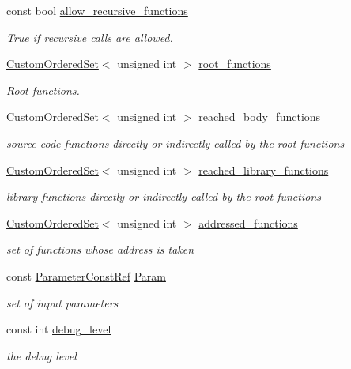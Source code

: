 \begin{DoxyCompactItemize}
const bool \hyperlink{classCallGraphManager_a04e714703a5d955d0ddb00664e89467d}{allow\+\_\+recursive\+\_\+functions}
\begin{DoxyCompactList}\small\item\em True if recursive calls are allowed. \end{DoxyCompactList}\item 
\hyperlink{classCustomOrderedSet}{Custom\+Ordered\+Set}$<$ unsigned int $>$ \hyperlink{classCallGraphManager_ad55ab572f629a824a3074728e2780640}{root\+\_\+functions}
\begin{DoxyCompactList}\small\item\em Root functions. \end{DoxyCompactList}\item 
\hyperlink{classCustomOrderedSet}{Custom\+Ordered\+Set}$<$ unsigned int $>$ \hyperlink{classCallGraphManager_a0416ed0f6be715340b059302d46b2d63}{reached\+\_\+body\+\_\+functions}
\begin{DoxyCompactList}\small\item\em source code functions directly or indirectly called by the root functions \end{DoxyCompactList}\item 
\hyperlink{classCustomOrderedSet}{Custom\+Ordered\+Set}$<$ unsigned int $>$ \hyperlink{classCallGraphManager_a37bdf97b52e3503e6c8b7f28f54d11ef}{reached\+\_\+library\+\_\+functions}
\begin{DoxyCompactList}\small\item\em library functions directly or indirectly called by the root functions \end{DoxyCompactList}\item 
\hyperlink{classCustomOrderedSet}{Custom\+Ordered\+Set}$<$ unsigned int $>$ \hyperlink{classCallGraphManager_a88ab0415905abb68305cf2ed36f85329}{addressed\+\_\+functions}
\begin{DoxyCompactList}\small\item\em set of functions whose address is taken \end{DoxyCompactList}\item 
const \hyperlink{Parameter_8hpp_a37841774a6fcb479b597fdf8955eb4ea}{Parameter\+Const\+Ref} \hyperlink{classCallGraphManager_a56c89c8fc4a0a38536bcd58005a428cb}{Param}
\begin{DoxyCompactList}\small\item\em set of input parameters \end{DoxyCompactList}\item 
const int \hyperlink{classCallGraphManager_a8905c760cbe8ffad17aa77bb57c572a9}{debug\+\_\+level}
\begin{DoxyCompactList}\small\item\em the debug level \end{DoxyCompactList}\end{DoxyCompactItemize}


